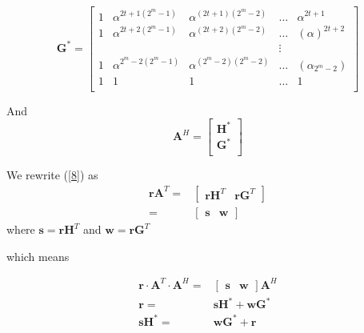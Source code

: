 \documentclass[fontsize=12pt]{article}
\begin{document}
\begin{equation}
\mathbf{G}^{*}=
\begin{bmatrix}
    1       &  \alpha^{2t+1(2^m-1)}   &  \alpha^{(2t+1)(2^m-2)}  & \dots &  \alpha^{2t+1}  \\
    1       &  \alpha^{2t+2(2^m-1)}  &   \alpha^{(2t+2)(2^m-2)}  & \dots   &  ( \alpha )^{2t+2} \\
    &&&\vdots{} \\
    1       &  \alpha^{2^m-2(2^m-1)}& \alpha^{(2^m-2)(2^m-2)}  & \dots  &  (\alpha_{2^m-2}) \\
    1       & 1&  1 & \dots & 1  \\
\end{bmatrix}
\end{equation}

And 
\begin{equation}
\mathbf{A}^{H}=
\begin{bmatrix}
    \mathbf{H}^{*}   \\
    \mathbf{G}^{*}       \\
\end{bmatrix}
\end{equation}

We rewrite (\ref{8}) as
\begin{equation}
\begin{split}
\mathbf{r}\mathbf{A}^T=&\begin{bmatrix} \mathbf{rH}^{T}& \mathbf{rG}^{T} \end{bmatrix}\\
=&\begin{bmatrix} \mathbf{s}& \mathbf{w} \end{bmatrix}
\end{split}
\label{13}
\end{equation}
where $\mathbf{s}=\mathbf{rH}^{T}$ and $\mathbf{w}=\mathbf{rG}^{T}$

which means 

\begin{equation}
\begin{split}
\mathbf{r}\cdot \mathbf{A}^T\cdot \mathbf{A}^H=&\begin{bmatrix} \mathbf{s}& \mathbf{w} \end{bmatrix}\mathbf{A}^H\\
\mathbf{r}=&\mathbf{s}\mathbf{H}^{*}+ \mathbf{w}\mathbf{G}^{*} \\
 \mathbf{s}\mathbf{H}^{*}=& \mathbf{w}\mathbf{G}^{*} + \mathbf{r}
\end{split}
\label{15}
\end{equation}
\end{document}
